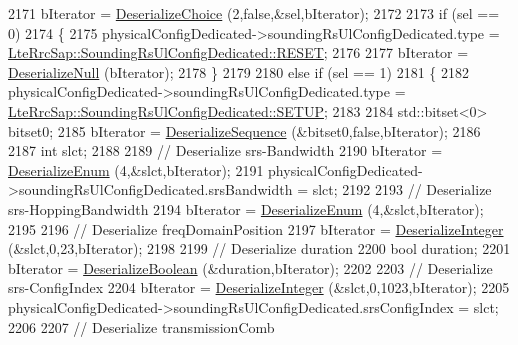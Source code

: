 \begin{DoxyCode}
2171       bIterator = \hyperlink{classns3_1_1Asn1Header_a0af5881f07a0549a8693a1b75c229a90}{DeserializeChoice} (2,\textcolor{keyword}{false},&sel,bIterator);
2172 
2173       \textcolor{keywordflow}{if} (sel == 0)
2174         \{
2175           physicalConfigDedicated->soundingRsUlConfigDedicated.type = 
      \hyperlink{structns3_1_1LteRrcSap_1_1SoundingRsUlConfigDedicated_a79c5b04ec873cbf1a52b7e0d9b76a5a7acf6c9469b179db793d38b6d3e78516f5}{LteRrcSap::SoundingRsUlConfigDedicated::RESET};
2176 
2177           bIterator = \hyperlink{classns3_1_1Asn1Header_a29bd4508f3f1ef636b3480f524fac0ce}{DeserializeNull} (bIterator);
2178         \}
2179 
2180       \textcolor{keywordflow}{else} \textcolor{keywordflow}{if} (sel == 1)
2181         \{
2182           physicalConfigDedicated->soundingRsUlConfigDedicated.type = 
      \hyperlink{structns3_1_1LteRrcSap_1_1SoundingRsUlConfigDedicated_a79c5b04ec873cbf1a52b7e0d9b76a5a7a457376b675eb174369652c323f5f9a36}{LteRrcSap::SoundingRsUlConfigDedicated::SETUP};
2183 
2184           std::bitset<0> bitset0;
2185           bIterator = \hyperlink{classns3_1_1Asn1Header_a58c68bb97ba3fe2e8fcdd7c208d672b2}{DeserializeSequence} (&bitset0,\textcolor{keyword}{false},bIterator);
2186 
2187           \textcolor{keywordtype}{int} slct;
2188 
2189           \textcolor{comment}{// Deserialize srs-Bandwidth}
2190           bIterator = \hyperlink{classns3_1_1Asn1Header_a4fcc253e0eec3483c775b005c1875f2d}{DeserializeEnum} (4,&slct,bIterator);
2191           physicalConfigDedicated->soundingRsUlConfigDedicated.srsBandwidth = slct;
2192 
2193           \textcolor{comment}{// Deserialize srs-HoppingBandwidth}
2194           bIterator = \hyperlink{classns3_1_1Asn1Header_a4fcc253e0eec3483c775b005c1875f2d}{DeserializeEnum} (4,&slct,bIterator);
2195 
2196           \textcolor{comment}{// Deserialize freqDomainPosition}
2197           bIterator = \hyperlink{classns3_1_1Asn1Header_a49802c9af30018b078150e866b6ecae2}{DeserializeInteger} (&slct,0,23,bIterator);
2198 
2199           \textcolor{comment}{// Deserialize duration}
2200           \textcolor{keywordtype}{bool} duration;
2201           bIterator = \hyperlink{classns3_1_1Asn1Header_ab46f4b86988a0fbeb5df11a9bc46222d}{DeserializeBoolean} (&duration,bIterator);
2202 
2203           \textcolor{comment}{// Deserialize srs-ConfigIndex}
2204           bIterator = \hyperlink{classns3_1_1Asn1Header_a49802c9af30018b078150e866b6ecae2}{DeserializeInteger} (&slct,0,1023,bIterator);
2205           physicalConfigDedicated->soundingRsUlConfigDedicated.srsConfigIndex = slct;
2206 
2207           \textcolor{comment}{// Deserialize transmissionComb}

\end{DoxyCode}
